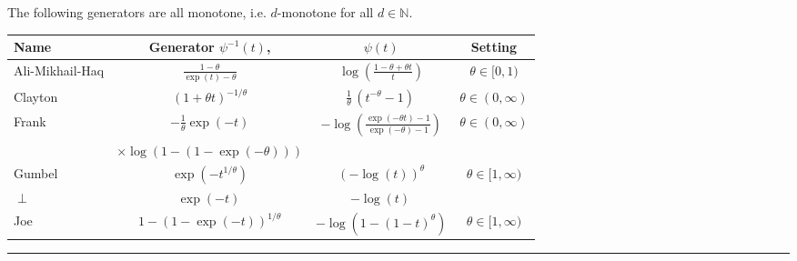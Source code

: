 \begin{f}[Copula]
The following generators are all monotone, i.e. $d$-monotone for all $d\in\mathbb{N}$.

\footnotesize
\renewcommand\arraystretch{1.3}
\begin{tabular}{|m{10mm}|ccc|}	\rowcolor{BleuProfondIRA!40} 
	\hline
 Name 		& Generator $\psi^{-1}(t)$, 	& $\psi(t)$ &	Setting\\
	\hline
	Ali-Mikhail-Haq 	&$\frac{1-\theta}{\exp(t)-\theta} $	
	&$\log\left(\frac{1-\theta+\theta t}{t}\right)$ 	
	&$\theta\in[0,1)$\\
	Clayton		&$\left(1+\theta t\right)^{-1/\theta} 	$
	&$\frac1\theta\,(t^{-\theta}-1)\, 	$
	&$\theta\in(0,\infty)$\\
	Frank 		&$-\frac{1}{\theta}\exp(-t)$
	&$-\log\left(\frac{\exp(-\theta t)-1}{\exp(-\theta)-1}\right)$
	&$\theta\in(0,\infty)$\\
	&$\times\log(1-(1-\exp(-\theta)))$
	&
	&\\
	Gumbel 		&$\exp\left(-t^{1/\theta}\right) $	
	&$\left(-\log(t)\right)^\theta$	
	&$\theta\in[1,\infty)$\\
	$\perp$ 	&$\exp(-t)\,$
	&$-\log(t)\,$ 	
	& \\
	Joe		&$1-\left(1-\exp(-t)\right)^{1/\theta}$
	&$-\log\left(1-(1-t)^\theta\right)$
	&$\theta\in[1,\infty)$\\
	\hline
\end{tabular}
\renewcommand\arraystretch{1}
\end{f}
\hrule

